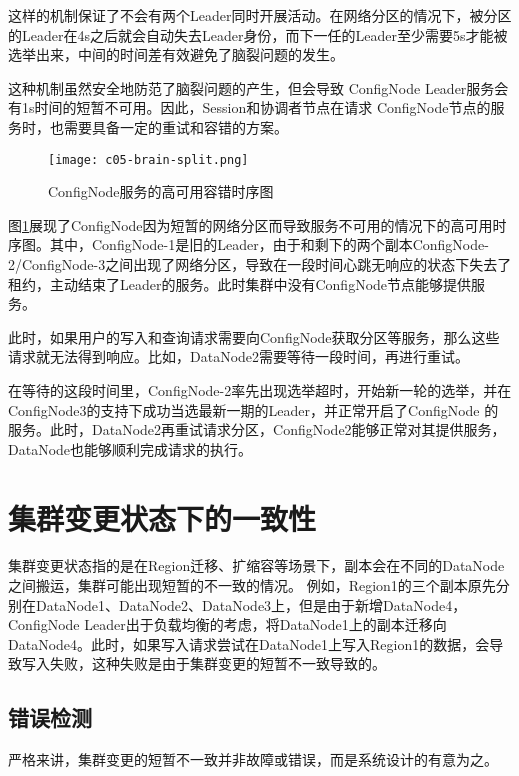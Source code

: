 这样的机制保证了不会有两个Leader同时开展活动。在网络分区的情况下，被分区的Leader在4s之后就会自动失去Leader身份，而下一任的Leader至少需要5s才能被选举出来，中间的时间差有效避免了脑裂问题的发生。

这种机制虽然安全地防范了脑裂问题的产生，但会导致 ConfigNode Leader服务会有1s时间的短暂不可用。因此，Session和协调者节点在请求
ConfigNode节点的服务时，也需要具备一定的重试和容错的方案。

\begin{figure}
    \centering
    \texttt{[image: c05-brain-split.png]}
    \caption{ConfigNode服务的高可用容错时序图}
    \label{fig:c05-brain-split}
\end{figure}

图\ref{fig:c05-brain-split}展现了ConfigNode因为短暂的网络分区而导致服务不可用的情况下的高可用时序图。其中，ConfigNode-1是旧的Leader，由于和剩下的两个副本ConfigNode-2/ConfigNode-3之间出现了网络分区，导致在一段时间心跳无响应的状态下失去了租约，主动结束了Leader的服务。此时集群中没有ConfigNode节点能够提供服务。

此时，如果用户的写入和查询请求需要向ConfigNode获取分区等服务，那么这些请求就无法得到响应。比如，DataNode2需要等待一段时间，再进行重试。

在等待的这段时间里，ConfigNode-2率先出现选举超时，开始新一轮的选举，并在ConfigNode3的支持下成功当选最新一期的Leader，并正常开启了ConfigNode 的服务。此时，DataNode2再重试请求分区，ConfigNode2能够正常对其提供服务，DataNode也能够顺利完成请求的执行。


\section{集群变更状态下的一致性}

集群变更状态指的是在Region迁移、扩缩容等场景下，副本会在不同的DataNode之间搬运，集群可能出现短暂的不一致的情况。
例如，Region1的三个副本原先分别在DataNode1、DataNode2、DataNode3上，但是由于新增DataNode4，ConfigNode Leader出于负载均衡的考虑，将DataNode1上的副本迁移向DataNode4。此时，如果写入请求尝试在DataNode1上写入Region1的数据，会导致写入失败，这种失败是由于集群变更的短暂不一致导致的。



\subsection{错误检测}

严格来讲，集群变更的短暂不一致并非故障或错误，而是系统设计的有意为之。

